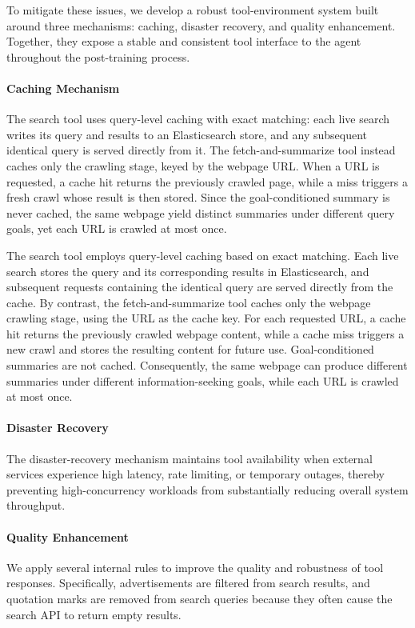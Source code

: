 \documentclass{huawei}
\begin{document}
To mitigate these issues, we develop a robust tool-environment system built around three mechanisms: caching, disaster recovery, and quality enhancement. Together, they expose a stable and consistent tool interface to the agent throughout the post-training process.


\paragraph{Caching Mechanism}
The search tool uses query-level caching with exact matching: each live search writes its query and results to  an Elasticsearch store, and any subsequent identical query is served directly from it. The fetch-and-summarize tool instead caches only the crawling stage, keyed by the webpage URL. When a URL is requested, a cache hit returns the previously crawled page, while a miss triggers a fresh crawl whose result is then stored. Since the goal-conditioned summary is never cached, the same webpage yield distinct summaries under different query goals, yet each URL is crawled at most once.


The search tool employs query-level caching based on exact matching. Each live search stores the query and its corresponding results in Elasticsearch, and subsequent requests containing the identical query are served directly from the cache. By contrast, the fetch-and-summarize tool caches only the webpage crawling stage, using the URL as the cache key. For each requested URL, a cache hit returns the previously crawled webpage content, while a cache miss triggers a new crawl and stores the resulting content for future use. Goal-conditioned summaries are not cached. Consequently, the same webpage can produce different summaries under different information-seeking goals, while each URL is crawled at most once.

\paragraph{Disaster Recovery} 
The disaster-recovery mechanism maintains tool availability when external services experience high latency, rate limiting, or temporary outages, thereby preventing high-concurrency workloads from substantially reducing overall system throughput.

\paragraph{Quality Enhancement}
We apply several internal rules to improve the quality and robustness of tool responses. Specifically, advertisements are filtered from search results, and quotation marks are removed from search queries because they often cause the search API to return empty results.
\end{document}
